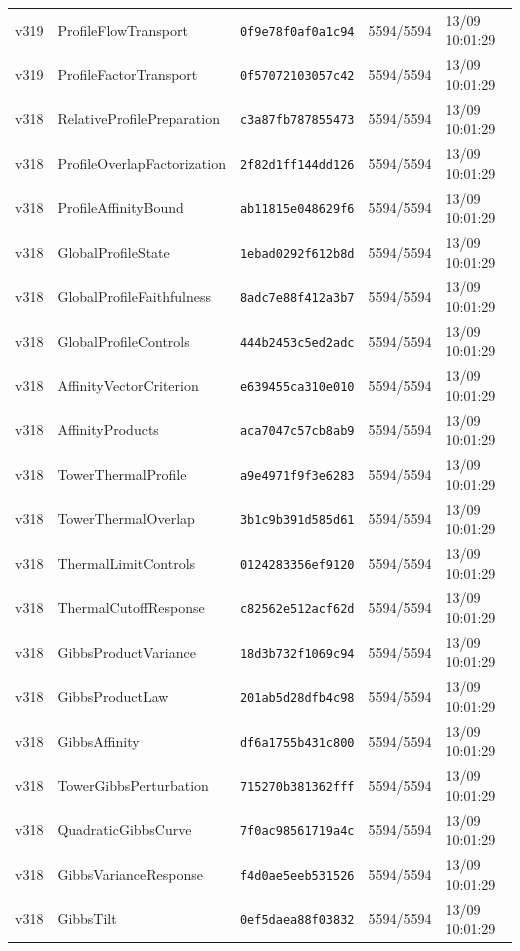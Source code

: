 \documentclass[11pt]{article}
\theoremstyle{definition}\newtheorem{deriv}{Derivation}
\begin{document}
{\begin{longtable}{@{}lllll@{}}
v319 & ProfileFlowTransport & \texttt{0f9e78f0af0a1c94} & 5594/5594 & 13/09 10:01:29 \\
v319 & ProfileFactorTransport & \texttt{0f57072103057c42} & 5594/5594 & 13/09 10:01:29 \\
v318 & RelativeProfilePreparation & \texttt{c3a87fb787855473} & 5594/5594 & 13/09 10:01:29 \\
v318 & ProfileOverlapFactorization & \texttt{2f82d1ff144dd126} & 5594/5594 & 13/09 10:01:29 \\
v318 & ProfileAffinityBound & \texttt{ab11815e048629f6} & 5594/5594 & 13/09 10:01:29 \\
v318 & GlobalProfileState & \texttt{1ebad0292f612b8d} & 5594/5594 & 13/09 10:01:29 \\
v318 & GlobalProfileFaithfulness & \texttt{8adc7e88f412a3b7} & 5594/5594 & 13/09 10:01:29 \\
v318 & GlobalProfileControls & \texttt{444b2453c5ed2adc} & 5594/5594 & 13/09 10:01:29 \\
v318 & AffinityVectorCriterion & \texttt{e639455ca310e010} & 5594/5594 & 13/09 10:01:29 \\
v318 & AffinityProducts & \texttt{aca7047c57cb8ab9} & 5594/5594 & 13/09 10:01:29 \\
v318 & TowerThermalProfile & \texttt{a9e4971f9f3e6283} & 5594/5594 & 13/09 10:01:29 \\
v318 & TowerThermalOverlap & \texttt{3b1c9b391d585d61} & 5594/5594 & 13/09 10:01:29 \\
v318 & ThermalLimitControls & \texttt{0124283356ef9120} & 5594/5594 & 13/09 10:01:29 \\
v318 & ThermalCutoffResponse & \texttt{c82562e512acf62d} & 5594/5594 & 13/09 10:01:29 \\
v318 & GibbsProductVariance & \texttt{18d3b732f1069c94} & 5594/5594 & 13/09 10:01:29 \\
v318 & GibbsProductLaw & \texttt{201ab5d28dfb4c98} & 5594/5594 & 13/09 10:01:29 \\
v318 & GibbsAffinity & \texttt{df6a1755b431c800} & 5594/5594 & 13/09 10:01:29 \\
v318 & TowerGibbsPerturbation & \texttt{715270b381362fff} & 5594/5594 & 13/09 10:01:29 \\
v318 & QuadraticGibbsCurve & \texttt{7f0ac98561719a4c} & 5594/5594 & 13/09 10:01:29 \\
v318 & GibbsVarianceResponse & \texttt{f4d0ae5eeb531526} & 5594/5594 & 13/09 10:01:29 \\
v318 & GibbsTilt & \texttt{0ef5daea88f03832} & 5594/5594 & 13/09 10:01:29 \\

\end{longtable}}
\end{document}
